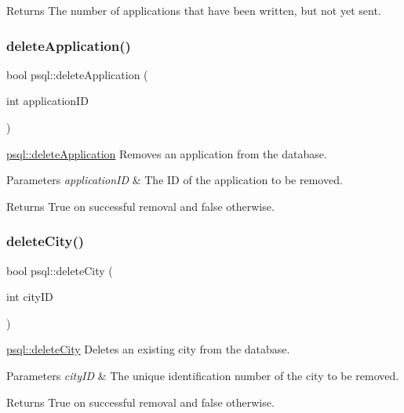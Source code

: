 \begin{DoxyReturn}{Returns}
The number of applications that have been written, but not yet sent. 
\end{DoxyReturn}
\mbox{\label{classpsql_a999ee8e2d813892411ef502ebc055a79}} 
\subsubsection{\texorpdfstring{delete\+Application()}{deleteApplication()}}
{\footnotesize\ttfamily bool psql\+::delete\+Application (\begin{DoxyParamCaption}\item[{int}]{application\+ID }\end{DoxyParamCaption})}



\mbox{\hyperlink{classpsql_a999ee8e2d813892411ef502ebc055a79}{psql\+::delete\+Application}} Removes an application from the database. 


\begin{DoxyParams}{Parameters}
{\em application\+ID} & The ID of the application to be removed. \\
\hline
\end{DoxyParams}
\begin{DoxyReturn}{Returns}
True on successful removal and false otherwise. 
\end{DoxyReturn}
\mbox{\label{classpsql_aaffd42b26b635d9881daaf5fbf4fd62f}} 
\subsubsection{\texorpdfstring{delete\+City()}{deleteCity()}}
{\footnotesize\ttfamily bool psql\+::delete\+City (\begin{DoxyParamCaption}\item[{int}]{city\+ID }\end{DoxyParamCaption})}



\mbox{\hyperlink{classpsql_aaffd42b26b635d9881daaf5fbf4fd62f}{psql\+::delete\+City}} Deletes an existing city from the database. 


\begin{DoxyParams}{Parameters}
{\em city\+ID} & The unique identification number of the city to be removed. \\
\hline
\end{DoxyParams}
\begin{DoxyReturn}{Returns}
True on successful removal and false otherwise. 
\end{DoxyReturn}
\mbox{\label{classpsql_a914bf8701fbed4ff80edcd0d09c7c3fd}} 
